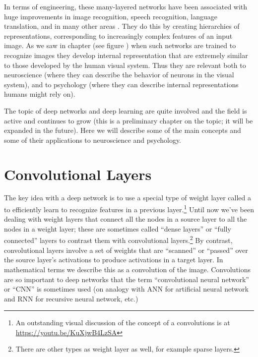 In terms of engineering, these many-layered networks have been associated with huge improvements in image recognition, speech recognition, language translation, and in many other areas \cite{lecun2015deep, goodfellow2016deep}. They do this by creating hierarchies of representations, corresponding  to increasingly complex features of an input image. As we saw in chapter  (see figure ) when such networks are trained to recognize images they develop internal representation that are extremely similar to those developed by the human visual  system. Thus they are relevant both to neuroscience (where they can describe the behavior of neurons in the visual system), and to psychology (where they can describe internal representations humans might rely on).

The topic of deep networks and deep learning are quite involved and the field is active and continues to grow (this is a preliminary chapter on the topic; it will be expanded in the future). Here we will describe some of the main concepts and some of their applications to neuroscience and psychology.

\section{Convolutional Layers}\label{convolutionalLayer}


The key idea with a deep network is to use a special type of weight layer called a  to efficiently learn to recognize features in a previous layer.\footnote{An outstanding visual discussion of the concept of a convolutions is at \url{https://youtu.be/KuXjwB4LzSA}} Until now we've been dealing with weight layers that connect all the nodes in a source layer to all the nodes in a weight layer; these are sometimes called ``dense layers'' or ``fully connected'' layers to contrast them with convolutional layers.\footnote{There are other types as weight layer as well, for example sparse layers.}  By contrast, convolutional layers involve a set of weights that are ``scanned'' or ``passed'' over the source layer's activations to produce activations in a target layer. In mathematical terms we describe this as a convolution of the image. Convolutions are so important to deep networks that the term ``convolutional neural network'' or ``CNN'' is sometimes used (on analogy with ANN for artificial neural network and RNN for recursive neural network, etc.)

